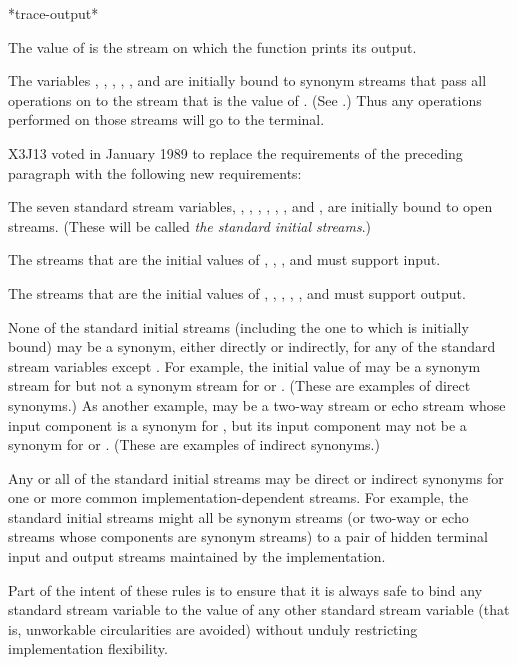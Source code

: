 \begin{defun}[Variable]
*trace-output*

The value of  is the stream on which the 
function prints its output.
\end{defun}

The variables
, ,
,
,
, and 
are initially bound to synonym streams that pass all
operations on to the stream that is the value of .
(See .)
Thus any operations performed on those streams will go to the terminal.

\begin{new}
X3J13 voted in January 1989
to replace the requirements of the preceding
paragraph with the following new requirements:

The seven standard stream variables,
, , ,
, ,
, and
,
are initially bound to open streams.  (These will be called
{\it the standard initial streams}.)

The streams that are the initial values of
, , , and 
must support input.

The streams that are the initial values of
,
,
, , , and 
must support output.

None of the standard initial streams (including the one to which
 is initially bound) may be a synonym, either directly
or indirectly, for any of the standard stream variables
except .  For example, the initial value of
 may be a synonym stream for 
but not a synonym stream for  or .
(These are examples of direct synonyms.)  As another example,
 may be a two-way stream or echo stream whose
input component is a synonym for ,
but its input component may not be a synonym for 
or .  (These are examples of indirect synonyms.)

Any or all of the standard initial streams may be direct or indirect
synonyms for one or more common implementation-dependent streams.
For example, the standard initial streams might all be synonym streams
(or two-way or echo streams whose components are synonym streams)
to a pair of hidden terminal input and output streams maintained by
the implementation.

Part of the intent of these rules is to ensure that it is always safe
to bind any standard stream variable to the value of any other
standard stream variable (that is, unworkable circularities are
avoided) without unduly restricting implementation flexibility.
\end{new}


